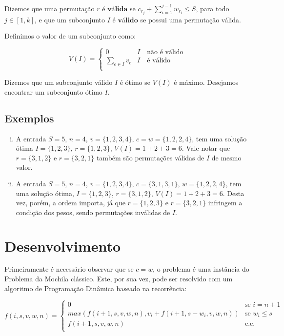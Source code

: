 Dizemos que uma permutação $r$ é $\textbf{válida}$ se $c_{r_j} + \sum_{i = 1}^{j - 1} w_{r_i} \leq S$, para todo $j \in [1, k]$, e que um subconjunto $I$ é $\textbf{válido}$ se possui uma permutação válida.

Definimos o valor de um subconjunto como:

\begin{equation} \label{pd:val}
  V(I) =
  \begin{cases}
  0                      & I\quad\text{não é válido} \\
  \sum_{e \in I} v_{e}   & I\quad\text{é válido} \\
  \end{cases}
\end{equation}

Dizemos que um subconjunto válido $I$ é ótimo se $V(I)$ é máximo. Desejamos encontrar um subconjunto ótimo $I$.

\subsection*{Exemplos}

\begin{enumerate}[i)]
    \item A entrada $S = 5$, $n = 4$, $v = \{1, 2, 3, 4\}$, $c = w = \{1, 2, 2, 4\}$, tem uma solução ótima $I = \{1, 2, 3\}$, $r = \{1, 2, 3\}$, $V(I) = 1 + 2 + 3 = 6$. Vale notar que $r = \{3, 1, 2\}$ e $r = \{3, 2, 1\}$ também são permutações válidas de $I$ de mesmo valor.
    \item A entrada $S = 5$, $n = 4$, $v = \{1, 2, 3, 4\}$, $c = \{3, 1, 3, 1\}$, $w = \{1, 2, 2, 4\}$, tem uma solução ótima, $I = \{1, 2, 3\}$, $r = \{3, 1, 2\}$, $V(I) = 1 + 2 + 3 = 6$. Desta vez, porém, a ordem importa, já que $r = \{1, 2, 3\}$ e $r = \{3, 2, 1\}$ infringem a condição dos pesos, sendo permutações inválidas de $I$. \label{pd:ex2}
\end{enumerate}

\section{Desenvolvimento}

Primeiramente é necessário observar que se $c = w$, o problema é uma instância do Problema da Mochila clássico. Este, por sua vez, pode ser resolvido com um algoritmo de Programação Dinâmica \cite{stefanot} baseado na recorrência:

\begin{equation} \label{pd:recnaiv}
  f(i, s, v, w, n) =
  \begin{cases}
  0                                                             & \text{se $i = n + 1$} \\
  max(f(i + 1, s, v, w, n), v_i + f(i + 1, s - w_i, v, w, n))   & \text{se $w_i \leq s$} \\
  f(i + 1, s, v, w, n)                                          & \text{c.c.} \\
  \end{cases}
\end{equation}

